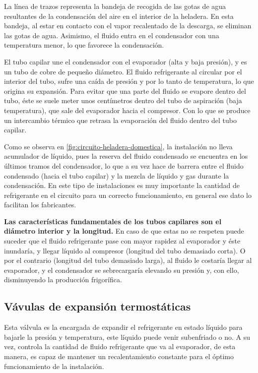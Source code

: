 La l\'inea de trazos representa la bandeja de recogida de las gotas de agua resultantes de la condensaci\'on del aire en el interior de la heladera. En esta bandeja, al estar en contacto con el vapor recalentado de la descarga, se eliminan las gotas de agua. Asimismo, el fluido entra en el condensador con una temperatura menor, lo que favorece la condensaci\'on.

El tubo capilar une el condensador con el evaporador (alta y baja presi\'on), y es un tubo de cobre de pequeño di\'ametro. El fluido refrigerante al circular por el interior del tubo, sufre una ca\'ida de presi\'on y por lo tanto de temperatura, lo que origina su expansi\'on. Para evitar que una parte del fluido se evapore dentro del tubo, \'este se suele meter unos cent\'imetros dentro del tubo de aspiraci\'on (baja temperatura), que sale del evaporador hacia el compresor. Con lo que se produce un intercambio t\'ermico que retrasa la evaporaci\'on del fluido dentro del tubo capilar. 

Como se observa en \autoref{fig:circuito-heladera-domestica}, la instalaci\'on no lleva acumulador de l\'iquido, pues la reserva del fluido condensado se encuentra en los \'ultimos tramos del condensador, lo que a su vez hace de barrera entre el fluido condensado (hacia el tubo capilar) y la mezcla de l\'iquido y gas durante la condensaci\'on. En este tipo de instalaciones es muy importante la cantidad de refrigerante en el circuito para un correcto funcionamiento, en general ese dato lo facilitan los fabricantes.

\textbf{Las caracter\'isticas fundamentales de los tubos capilares son el di\'ametro interior y la longitud.} En caso de que estas no se respeten puede suceder que el fluido refrigerante pase con mayor rapidez al evaporador y \'este inundar\'ia, y llegar l\'iquido al compresor (longitud del tubo demasiado corta). O por el contrario (longitud del tubo demasiado larga), al fluido le costar\'ia llegar al evaporador, y el condensador se sebrecargar\'ia elevando su presi\'on y, con ello, disminuyendo la producci\'on frigor\'ifica.

\subsection{V\'avulas de expansi\'on termost\'aticas}

Esta v\'alvula es la encargada de expandir el refrigerante en estado l\'iquido para bajarle la presi\'on y temperatura, este l\'iquido puede venir subenfriado o no. A su vez, controla la cantidad de fluido refrigerante que va al evaporador, de esta manera, es capaz de mantener un recalentamiento constante para el \'optimo funcionamiento de la instalaci\'on. 

